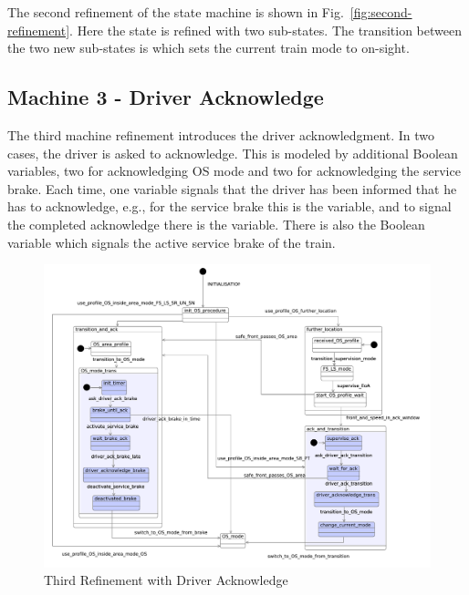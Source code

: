 \documentclass{template/openetcs_article}
\begin{document}
The second refinement of the state machine is shown in
Fig.~\ref{fig:second-refinement}. Here the state  is
refined with two sub-states. The transition between the two new sub-states
is  which sets the current train mode to
on-sight.

{\footnotesize

}

\subsection{Machine 3 - Driver Acknowledge}
\label{sec:machine-3-driver}

The third machine refinement introduces the driver acknowledgment. In two cases,
the driver is asked to acknowledge. This is modeled by additional Boolean
variables, two for acknowledging OS mode and two for acknowledging the service
brake. Each time, one variable signals that the driver has been informed that he
has to acknowledge, e.g., for the service brake this is the
 variable, and to signal the
completed acknowledge there is the 
variable. There is also the Boolean variable  which signals
the active service brake of the train.

\begin{figure}[ht]
  \centering
  \includegraphics[width=.95\textwidth]{m3_driver_ack_on_sight_procedure}
  \caption{Third Refinement with Driver Acknowledge}
  \label{fig:third-refinement-driver-ack}
\end{figure}
\end{document}

